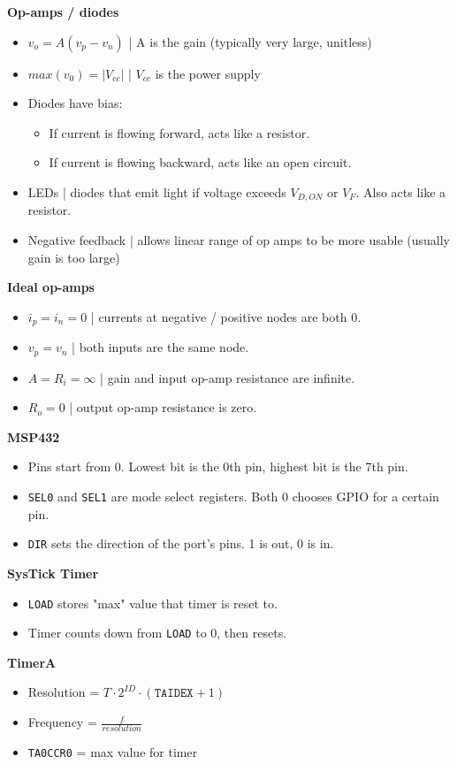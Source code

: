 \documentclass{article}
\begin{document}
\textbf{Op-amps / diodes}
\begin{itemize}
    \item $v_o = A(v_p - v_n)$ | A is the gain (typically very large, unitless)
    \item $max(v_0) = |V_{cc}|$ | $V_{cc}$ is the power supply
    \item Diodes have bias: 
    \begin{itemize}
        \item If current is flowing forward, acts like a resistor. 
        \item If current is flowing backward, acts like an open circuit.
    \end{itemize}
    \item LEDs | diodes that emit light if voltage exceeds $V_{D,ON}$ or $V_F$. Also acts like a resistor.
    \item Negative feedback | allows linear range of op amps to be more usable (usually gain is too large)
\end{itemize}
\textbf{Ideal op-amps}
\begin{itemize}
    \item $i_p = i_n = 0$ | currents at negative / positive nodes are both 0.
    \item $v_p = v_n$ | both inputs are the same node.
    \item $A = R_i = \infty$ | gain and input op-amp resistance are infinite.
    \item $R_o = 0$ | output op-amp resistance is zero.
\end{itemize}
\textbf{MSP432}
\begin{itemize}
    \item Pins start from 0. Lowest bit is the 0th pin, highest bit is the 7th pin.
    \item \texttt{SEL0} and \texttt{SEL1} are mode select registers. Both 0 chooses GPIO for a certain pin.
    \item \texttt{DIR} sets the direction of the port's pins. 1 is out, 0 is in.
\end{itemize}
\textbf{SysTick Timer}
\begin{itemize}
    \item \texttt{LOAD} stores "max" value that timer is reset to.
    \item Timer counts down from \texttt{LOAD} to 0, then resets.
\end{itemize}
\textbf{TimerA}
\begin{itemize}
    \item Resolution = $T \cdot 2^{ID} \cdot (\texttt{TAIDEX} + 1)$
    \item Frequency = $\frac{f}{resolution}$
    \item \texttt{TA0CCR0} = max value for timer
\end{itemize}
\end{document}
